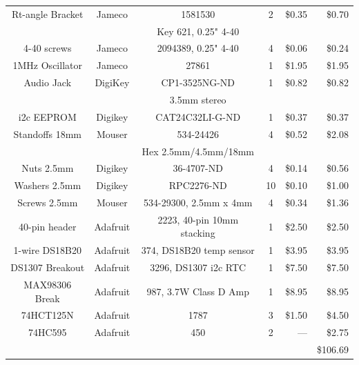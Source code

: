 \documentclass[11pt]{article}
\begin{document}
\begin{table}[thp]
\begin{tabular}{|c|c|c|c|r|r|}
\hline
Rt-angle Bracket& Jameco	& 1581530		  & 2	&  \$0.35  &  \$0.70 \\
		&		& Key 621, 0.25" 4-40	  &	&          &         \\
\hline
4-40 screws	& Jameco	& 2094389, 0.25" 4-40	  & 4	&  \$0.06  &  \$0.24 \\
\hline
1MHz Oscillator	& Jameco	& 27861			  & 1	& \$1.95   &  \$1.95 \\
\hline
Audio Jack	& DigiKey	& CP1-3525NG-ND	          & 1	&  \$0.82  &  \$0.82 \\
		&		& 3.5mm stereo		  &	&	   &	     \\
\hline
i2c EEPROM	& Digikey 	& CAT24C32LI-G-ND         & 1 	& \$0.37   &  \$0.37 \\
\hline
Standoffs 18mm	& Mouser	& 534-24426		  & 4   &  \$0.52  &  \$2.08 \\
		&		& Hex 2.5mm/4.5mm/18mm	  &	&	   &	     \\
\hline
Nuts   2.5mm	& Digikey	& 36-4707-ND		  & 4   &  \$0.14  & \$0.56 \\
\hline
Washers  2.5mm	& Digikey	& RPC2276-ND		  & 10   &  \$0.10  & \$1.00 \\
\hline
Screws 2.5mm	& Mouser	& 534-29300, 2.5mm x 4mm  & 4   &  \$0.34  &  \$1.36 \\
\hline
40-pin header	& Adafruit	& 2223, 40-pin 10mm stacking & 1	&  \$2.50  &  \$2.50 \\
\hline
1-wire DS18B20	& Adafruit	& 374, DS18B20 temp sensor& 1	&  \$3.95  &  \$3.95 \\
\hline
DS1307 Breakout	& Adafruit	& 3296, DS1307 i2c RTC	  & 1	&  \$7.50  &  \$7.50 \\
\hline
MAX98306 Break	& Adafruit	& 987, 3.7W Class D Amp   & 1	&  \$8.95  &  \$8.95 \\
\hline
74HCT125N	& Adafruit	& 1787			  & 3	&  \$1.50  &  \$4.50 \\
\hline
74HC595		& Adafruit	& 450			  & 2	&  ---     &  \$2.75 \\
\hline
\hline
		&		&		&	&		& \$106.69 \\
\hline
\end{tabular}
\end{table}
\end{document}
